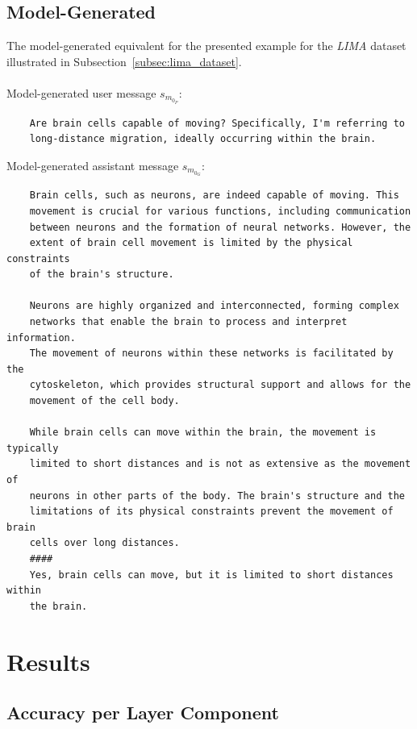 \subsection{Model-Generated}\label{subsec:appendix_model_generated_sample}
The model-generated equivalent for the presented example for the \emph{LIMA} dataset illustrated in Subsection~\ref{subsec:lima_dataset}.
\\\\
Model-generated user message $s_{m_{0_P}}$:
\begin{verbatim}
    Are brain cells capable of moving? Specifically, I'm referring to
    long-distance migration, ideally occurring within the brain.
\end{verbatim}
Model-generated assistant message $s_{m_{0_G}}$:
\begin{verbatim}
    Brain cells, such as neurons, are indeed capable of moving. This 
    movement is crucial for various functions, including communication 
    between neurons and the formation of neural networks. However, the 
    extent of brain cell movement is limited by the physical constraints
    of the brain's structure.

    Neurons are highly organized and interconnected, forming complex 
    networks that enable the brain to process and interpret information.
    The movement of neurons within these networks is facilitated by the 
    cytoskeleton, which provides structural support and allows for the 
    movement of the cell body.
    
    While brain cells can move within the brain, the movement is typically
    limited to short distances and is not as extensive as the movement of 
    neurons in other parts of the body. The brain's structure and the 
    limitations of its physical constraints prevent the movement of brain
    cells over long distances.
    ####
    Yes, brain cells can move, but it is limited to short distances within 
    the brain.
\end{verbatim}

\section{Results}

\subsection{Accuracy per Layer Component}

